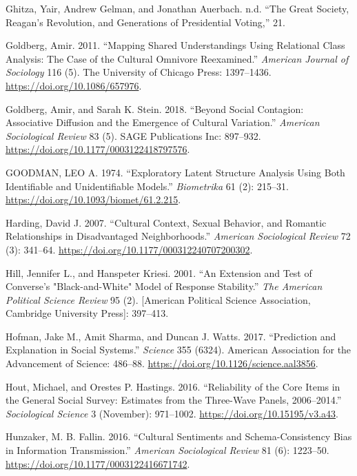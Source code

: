 \documentclass[12pt,]{article}
\begin{document}
\leavevmode\hypertarget{ref-ghitza}{}%
Ghitza, Yair, Andrew Gelman, and Jonathan Auerbach. n.d. ``The Great Society, Reagan's Revolution, and Generations of Presidential Voting,'' 21.

\leavevmode\hypertarget{ref-goldberg2011}{}%
Goldberg, Amir. 2011. ``Mapping Shared Understandings Using Relational Class Analysis: The Case of the Cultural Omnivore Reexamined.'' \emph{American Journal of Sociology} 116 (5). The University of Chicago Press: 1397--1436. \url{https://doi.org/10.1086/657976}.

\leavevmode\hypertarget{ref-goldberg2018}{}%
Goldberg, Amir, and Sarah K. Stein. 2018. ``Beyond Social Contagion: Associative Diffusion and the Emergence of Cultural Variation.'' \emph{American Sociological Review} 83 (5). SAGE Publications Inc: 897--932. \url{https://doi.org/10.1177/0003122418797576}.

\leavevmode\hypertarget{ref-goodman1974}{}%
GOODMAN, LEO A. 1974. ``Exploratory Latent Structure Analysis Using Both Identifiable and Unidentifiable Models.'' \emph{Biometrika} 61 (2): 215--31. \url{https://doi.org/10.1093/biomet/61.2.215}.

\leavevmode\hypertarget{ref-harding2007}{}%
Harding, David J. 2007. ``Cultural Context, Sexual Behavior, and Romantic Relationships in Disadvantaged Neighborhoods.'' \emph{American Sociological Review} 72 (3): 341--64. \url{https://doi.org/10.1177/000312240707200302}.

\leavevmode\hypertarget{ref-hill2001a}{}%
Hill, Jennifer L., and Hanspeter Kriesi. 2001. ``An Extension and Test of Converse's "Black-and-White" Model of Response Stability.'' \emph{The American Political Science Review} 95 (2). {[}American Political Science Association, Cambridge University Press{]}: 397--413.

\leavevmode\hypertarget{ref-hofman2017}{}%
Hofman, Jake M., Amit Sharma, and Duncan J. Watts. 2017. ``Prediction and Explanation in Social Systems.'' \emph{Science} 355 (6324). American Association for the Advancement of Science: 486--88. \url{https://doi.org/10.1126/science.aal3856}.

\leavevmode\hypertarget{ref-hout2016}{}%
Hout, Michael, and Orestes P. Hastings. 2016. ``Reliability of the Core Items in the General Social Survey: Estimates from the Three-Wave Panels, 2006--2014.'' \emph{Sociological Science} 3 (November): 971--1002. \url{https://doi.org/10.15195/v3.a43}.

\leavevmode\hypertarget{ref-hunzaker2016}{}%
Hunzaker, M. B. Fallin. 2016. ``Cultural Sentiments and Schema-Consistency Bias in Information Transmission.'' \emph{American Sociological Review} 81 (6): 1223--50. \url{https://doi.org/10.1177/0003122416671742}.
\end{document}
